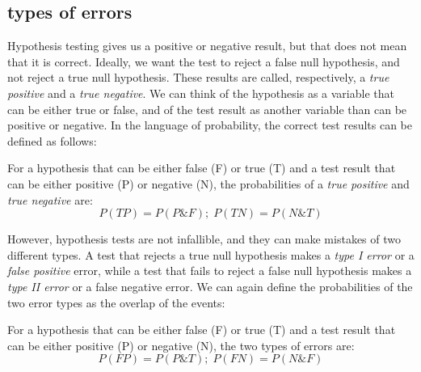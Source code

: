 \documentclass[
  letterpaper,
  DIV=11,
  numbers=noendperiod]{scrreprt}
\begin{document}
\hypertarget{types-of-errors}{%
\subsection{types of errors}\label{types-of-errors}}

Hypothesis testing gives us a positive or negative result, but that does
not mean that it is correct. Ideally, we want the test to reject a false
null hypothesis, and not reject a true null hypothesis. These results
are called, respectively, a \emph{true positive} and a \emph{true
negative}. We can think of the hypothesis as a variable that can be
either true or false, and of the test result as another variable than
can be positive or negative. In the language of probability, the correct
test results can be defined as follows:

\begin{tcolorbox}[enhanced jigsaw, coltitle=black, arc=.35mm, opacitybacktitle=0.6, breakable, bottomtitle=1mm, toptitle=1mm, titlerule=0mm, colback=white, leftrule=.75mm, rightrule=.15mm, colframe=quarto-callout-note-color-frame, colbacktitle=quarto-callout-note-color!10!white, opacityback=0, title=\textcolor{quarto-callout-note-color}{\faInfo}\hspace{0.5em}{Definition}, left=2mm, toprule=.15mm, bottomrule=.15mm]

For a hypothesis that can be either false (F) or true (T) and a test
result that can be either positive (P) or negative (N), the
probabilities of a \emph{true positive} and \emph{true negative} are:
\[ 
P(TP) = P(P \& F); \; P(TN) = P(N \& T)
\]

\end{tcolorbox}

However, hypothesis tests are not infallible, and they can make mistakes
of two different types. A test that rejects a true null hypothesis makes
a \emph{type I error} or a \emph{false positive} error, while a test
that fails to reject a false null hypothesis makes a \emph{type II
error} or a false negative error. We can again define the probabilities
of the two error types as the overlap of the events:

\begin{tcolorbox}[enhanced jigsaw, coltitle=black, arc=.35mm, opacitybacktitle=0.6, breakable, bottomtitle=1mm, toptitle=1mm, titlerule=0mm, colback=white, leftrule=.75mm, rightrule=.15mm, colframe=quarto-callout-note-color-frame, colbacktitle=quarto-callout-note-color!10!white, opacityback=0, title=\textcolor{quarto-callout-note-color}{\faInfo}\hspace{0.5em}{Definition}, left=2mm, toprule=.15mm, bottomrule=.15mm]

For a hypothesis that can be either false (F) or true (T) and a test
result that can be either positive (P) or negative (N), the two types of
errors are: \[ 
P(FP) = P(P \& T); \; P(FN) = P(N \& F)
\]

\end{tcolorbox}
\end{document}

